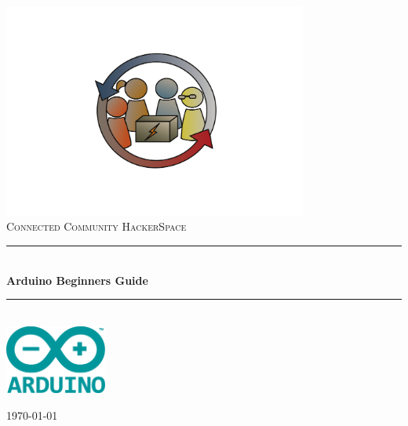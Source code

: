 \newcommand{\HRule}{\rule{\linewidth}{0.5mm}}

\begin{titlepage}
\begin{center}
\includegraphics[width=0.75\textwidth]{./Misc/logo}~\\[1cm]


\textsc{\LARGE Connected Community HackerSpace}\\[1.5cm]
\HRule \\[0.5cm]
{ \huge \bfseries Arduino Beginners Guide\\[0.5cm] }
\HRule \\[3.5cm]
\includegraphics[width=0.25\textwidth]{./Misc/arduino_logo}~
\vfill

{\large \today}

\end{center}
\end{titlepage}
